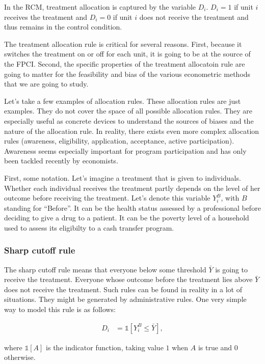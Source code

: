 \documentclass[]{book}
\newcommand{\uns}[1]{\mathds{1}[ #1 ]}
\theoremstyle{definition}
\theoremstyle{definition}
\theoremstyle{definition}
\theoremstyle{remark}
\begin{document}
In the RCM, treatment allocation is captured by the variable \(D_i\).
\(D_i=1\) if unit \(i\) receives the treatment and \(D_i=0\) if unit
\(i\) does not receive the treatment and thus remains in the control
condition.

The treatment allocation rule is critical for several reasons. First,
because it switches the treatment on or off for each unit, it is going
to be at the source of the FPCI. Second, the specific properties of the
treatment allocatoin rule are going to matter for the feasibility and
bias of the various econometric methods that we are going to study.

Let's take a few examples of allocation rules. These allocation rules
are just examples. They do not cover the space of all possible
allocation rules. They are especially useful as concrete devices to
understand the sources of biases and the nature of the allocation rule.
In reality, there exists even more complex allocation rules (awareness,
eligibility, application, acceptance, active participation). Awareness
seems especially important for program participation and has only been
tackled recently by economists.

First, some notation. Let's imagine a treatment that is given to
individuals. Whether each individual receives the treatment partly
depends on the level of her outcome before receiving the treatment.
Let's denote this variable \(Y^B_i\), with \(B\) standing for
``Before''. It can be the health status assessed by a professional
before deciding to give a drug to a patient. It can be the poverty level
of a household used to assess its eligibilty to a cash transfer program.

\subsubsection{Sharp cutoff rule}\label{sharp-cutoff-rule}

The sharp cutoff rule means that everyone below some threshold
\(\bar{Y}\) is going to receive the treatment. Everyone whose outcome
before the treatment lies above \(\bar{Y}\) does not receive the
treatment. Such rules can be found in reality in a lot of situations.
They might be generated by administrative rules. One very simple way to
model this rule is as follows:

\begin{align}\label{eq:cutoff}
  D_i & = \uns{Y_i^B\leq\bar{Y}},
\end{align}

where \(\uns{A}\) is the indicator function, taking value \(1\) when
\(A\) is true and \(0\) otherwise.
\end{document}
